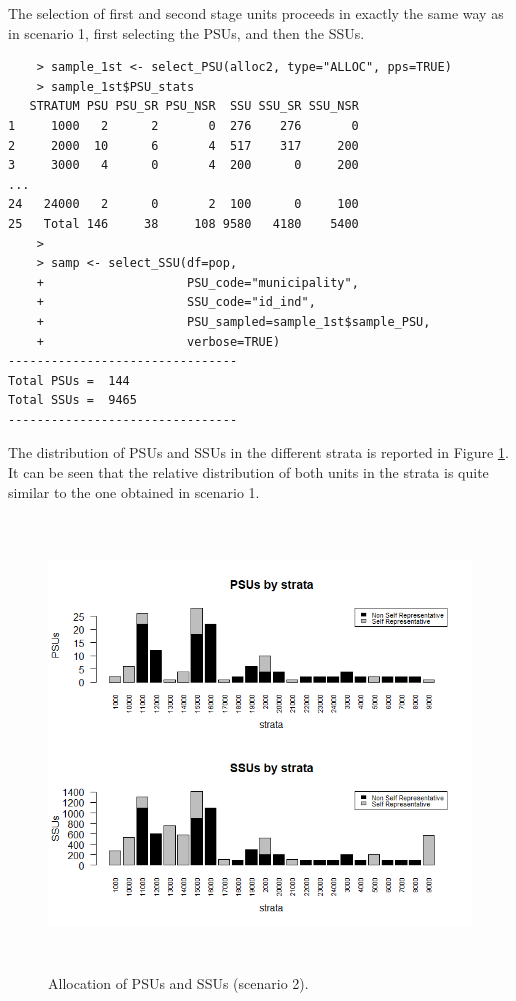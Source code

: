 The selection of first and second stage units proceeds in exactly the same way as in scenario 1, first selecting the PSUs, and then the SSUs. 

\begin{verbatim}
	> sample_1st <- select_PSU(alloc2, type="ALLOC", pps=TRUE)
	> sample_1st$PSU_stats
   STRATUM PSU PSU_SR PSU_NSR  SSU SSU_SR SSU_NSR
1     1000   2      2       0  276    276       0
2     2000  10      6       4  517    317     200
3     3000   4      0       4  200      0     200
...
24   24000   2      0       2  100      0     100
25   Total 146     38     108 9580   4180    5400
	>
	> samp <- select_SSU(df=pop,
	+                    PSU_code="municipality",
	+                    SSU_code="id_ind",
	+                    PSU_sampled=sample_1st$sample_PSU,
	+                    verbose=TRUE)
--------------------------------
Total PSUs =  144
Total SSUs =  9465
--------------------------------
\end{verbatim}

The distribution of PSUs and SSUs in the different strata is reported in Figure \ref{alloca2}. It can be seen that the relative distribution of both units in the strata is quite similar to the one obtained in scenario 1.

\begin{figure} [h!]
	\centering
	\includegraphics[width=15cm,height=12cm]{allocation2.png}
	\caption{Allocation of PSUs and SSUs (scenario 2).}
	\label{alloca2}
\end{figure}

